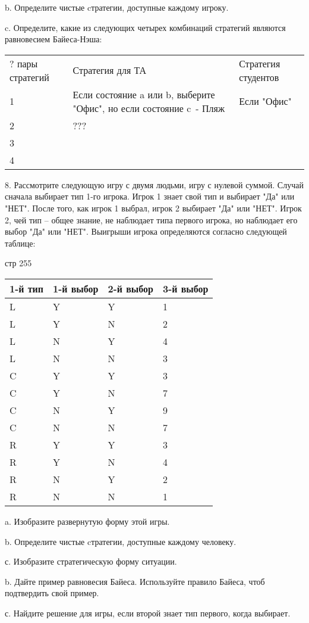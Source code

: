 \documentclass[a4paper,12pt]{article}
\begin{document}
b. Определите чистые cтратегии, доступные каждому
игроку.

c. Определите, какие из следующих четырех
комбинаций стратегий являются равновесием
Байеса-Нэша:

\begin{tabular}{lll}
{?} пары стратегий & Стратегия для ТА & Стратегия
студентов \\ 1 & Если состояние a или b, выберите
"Офис", но если состояние c\ - Пляж & Если "Офис"
\\ 2 & ??? &
\\ 3 &  &  \\ 4 &  &
\end{tabular}

8. Рассмотрите следующую игру с двумя людьми, игру
с нулевой суммой. Случай сначала выбирает тип 1-го
игрока. Игрок 1 знает свой тип и выбирает "Да" или
"НЕТ". После того, как игрок 1 выбрал, игрок 2
выбирает "Да" или "НЕТ". Игрок 2, чей тип -- общее
знание, не наблюдает типа первого игрока, но
наблюдает его выбор "Да" или "НЕТ". Выигрыши игрока
определяются согласно следующей таблице:

стр 255

\begin{tabular}{|l|l|l|l|}
\hline 1-й тип & 1-й выбор & 2-й выбор & 3-й выбор
\\ \hline
L & Y & Y & 1 \\ L & Y & N & 2 \\ L & N & Y & 4 \\ L & N & N & 3 \\
C & Y & Y & 3 \\ C & Y & N & 7 \\ C & N & Y & 9 \\ C & N & N & 7 \\
R & Y & Y & 3 \\ R & Y & N & 4 \\ R & N & Y & 2 \\
R & N & N & 1 \\ \hline
\end{tabular}

a. Изобразите развернутую форму этой игры.

b. Определите чистые cтратегии, доступные каждому
человеку.

с. Изобразите стратегическую форму ситуации.

b. Дайте пример равновесия Байеса. Используйте
правило Байеса, чтоб подтвердить свой пример.

с. Найдите решение для игры, если второй знает тип
первого, когда выбирает.
\end{document}
